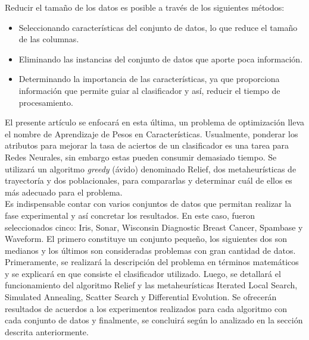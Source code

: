 \documentclass{ci5652}
\begin{document}
Reducir el tamaño de los datos es posible a través de los siguientes métodos:

\begin{itemize}
  \item Seleccionando características del conjunto de datos, lo que reduce el
  tamaño de las columnas.
  \item Eliminando las instancias del conjunto de datos que aporte poca
  información.
  \item Determinando la importancia de las características, ya que proporciona
  información que permite guiar al clasificador y así, reducir el tiempo de
  procesamiento.\cite{Cano_2003}
\end{itemize}

El presente artículo se enfocará en esta última, un problema de optimización
lleva el nombre de Aprendizaje de Pesos en Características. Usualmente, ponderar
los atributos para mejorar la tasa de aciertos de un clasificador es una tarea
para Redes Neurales, sin embargo estas pueden consumir demasiado tiempo. Se
utilizará un algoritmo \textit{greedy} (ávido) denominado Relief, dos
metaheurísticas de trayectoría y dos poblacionales, para compararlas y
determinar cuál de ellos es más adecuado para el problema.\\

Es indispensable contar con varios conjuntos de datos que permitan realizar la
fase experimental y así concretar los resultados. En este caso, fueron
seleccionados cinco: Iris, Sonar, Wisconsin Diagnostic Breast Cancer, Spambase y
Waveform. El primero constituye un conjunto pequeño, los siguientes dos son
medianos y los últimos son consideradas problemas con gran cantidad de datos.\\

Primeramente, se realizará la descripción del problema en términos matemáticos y
se explicará en que consiste el clasificador utilizado. Luego, se detallará el
funcionamiento del algoritmo Relief y las metaheurísticas Iterated Local Search,
Simulated Annealing, Scatter Search y Differential Evolution. Se ofrecerán
resultados de acuerdos a los experimentos realizados para cada algoritmo con
cada conjunto de datos y finalmente, se concluirá según lo analizado en la
sección descrita anteriormente.

\end{document}

